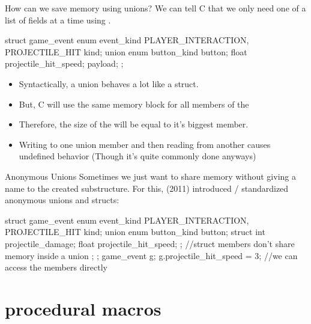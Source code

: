 \documentclass[10pt,graphics,aspectratio=169,table]{beamer}
\begin{document}
\begin{frame}[fragile]{How can we save memory using unions?}
    We can tell C that we only need one of a list of fields at a 
    time using .

    \begin{codeblock}
struct game_event{
    enum event_kind {PLAYER_INTERACTION, PROJECTILE_HIT} kind;
    union {
        enum button_kind button;    
        float projectile_hit_speed; 
    } payload;
};
    \end{codeblock}
    \begin{itemize}
        \item Syntactically, a union behaves a lot like a struct.
        \item But, C will use the same memory block for all members
        of the 
        \item Therefore, the size of the  will 
        be equal to it's biggest member.
        \item Writing to one union member and then reading from another causes
            undefined behavior (Though it's quite commonly done anyways)
    \end{itemize}
\end{frame}

\begin{frame}[fragile]{Anonymous Unions}
    Sometimes we just want to share memory without giving a name to the 
    created substructure. For this,  (2011) introduced / standardized 
    anonymous unions and structs:

    \begin{codeblock}
struct game_event{
    enum event_kind {PLAYER_INTERACTION, PROJECTILE_HIT} kind;
    union {
        enum button_kind button;    
        struct {
            int projectile_damage; 
            float projectile_hit_speed; 
        }; //struct members don't share memory inside a union
    };
};
game_event g;
g.projectile_hit_speed = 3; //we can access the members directly
    \end{codeblock}
\end{frame}


\section{procedural macros}
\end{document}
